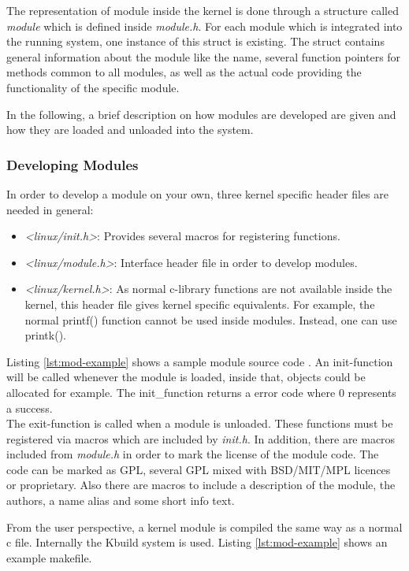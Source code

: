 \documentclass{sig-alternate-05-2015}
\begin{document}
The representation of module inside the kernel is done through a structure called \emph{module} which is defined inside \emph{module.h}. For each module which is integrated into the running system, one instance of this struct is existing. The struct contains general information about the module like the name, several function pointers for methods common to all modules, as well as the actual code providing the functionality of the specific module.

In the following, a brief description on how modules are developed are given and how they are loaded and unloaded into the system.


\subsubsection{Developing Modules}
In order to develop a module on your own, three kernel specific header files are needed in general:
\begin{itemize}
\item \emph{<linux/init.h>}: Provides several macros for registering functions.
\item \emph{<linux/module.h>}: Interface header file in order to develop modules.
\item \emph{<linux/kernel.h>}: As normal c-library functions are not available inside the kernel, this header file gives kernel specific equivalents. For example, the normal printf() function cannot be used inside modules. Instead, one can use printk().
\end{itemize}
 Listing \ref{lst:mod-example} shows a sample module source code .
An init-function will be called whenever the module is loaded, inside that, objects could be allocated for example. The init\_function returns a error code where  0 represents a success. \\
The exit-function is called when a module is unloaded. 
These functions must be registered via macros which are included by \emph{init.h}.  In addition, there are macros included from \emph{module.h} in order to mark the license of the module code. The code can be marked as GPL, several GPL mixed with BSD/MIT/MPL licences or proprietary. Also there are macros to include a description of the module, the authors, a name alias and some short info text.




From the user perspective, a kernel module is compiled the same way as a normal c file. Internally the Kbuild system is used. Listing \ref{lst:mod-example} shows an example makefile.
\end{document}
